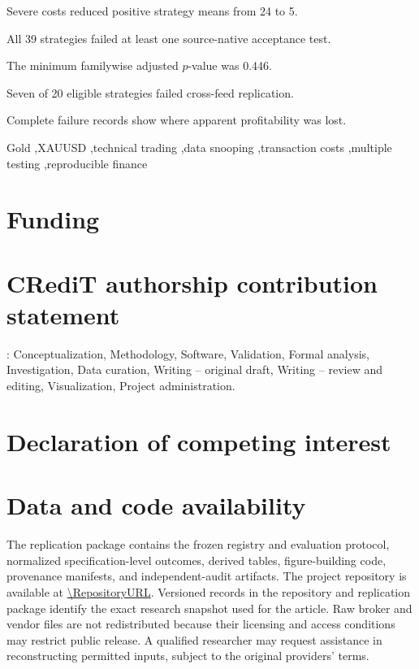 \documentclass[a4paper,fleqn]{cas-sc}
\begin{document}
\begin{highlights}
\item Severe costs reduced positive strategy means from 24 to 5.
\item All 39 strategies failed at least one source-native acceptance test.
\item The minimum familywise adjusted $p$-value was 0.446.
\item Seven of 20 eligible strategies failed cross-feed replication.
\item Complete failure records show where apparent profitability was lost.
\end{highlights}

\begin{keywords}
Gold \sep XAUUSD \sep technical trading \sep data snooping \sep transaction costs \sep multiple testing \sep reproducible finance
\end{keywords}

\maketitle



\section*{Funding}
\FundingStatement

\section*{CRediT authorship contribution statement}
\AuthorName: Conceptualization, Methodology, Software, Validation, Formal analysis, Investigation, Data curation, Writing -- original draft, Writing -- review and editing, Visualization, Project administration.

\section*{Declaration of competing interest}
\InterestStatement

\section*{Data and code availability}
The replication package contains the frozen registry and evaluation protocol, normalized specification-level outcomes, derived tables, figure-building code, provenance manifests, and independent-audit artifacts. The project repository is available at \expandafter\url\expandafter{\RepositoryURL}. Versioned records in the repository and replication package identify the exact research snapshot used for the article. Raw broker and vendor files are not redistributed because their licensing and access conditions may restrict public release. A qualified researcher may request assistance in reconstructing permitted inputs, subject to the original providers' terms.
\end{document}
